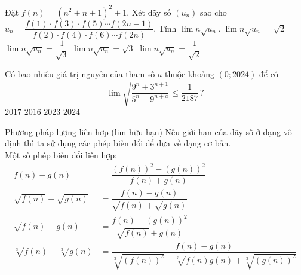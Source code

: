 \begin{ex}%
	Đặt $f(n)=\left(n^2+n+1\right)^2+1$.
	Xét dãy số $(u_n)$ sao cho $u_n=\dfrac{f(1)\cdot f(3)\cdot f(5)\cdots f(2n-1)}{f(2)\cdot f(4)\cdot f(6)\cdots f(2n)}$. Tính $\lim n\sqrt{u_n}$. 
	\choice
	{$\lim n\sqrt{u_n}=\sqrt{2}$}
	{$\lim n\sqrt{u_n}=\dfrac{1}{\sqrt{3}}$}
	{$\lim n\sqrt{u_n}=\sqrt{3}$}
	{\True $\lim n\sqrt{u_n}=\dfrac{1}{\sqrt{2}}$}
\end{ex}
\begin{ex}%
	Có bao nhiêu giá trị nguyên của tham số $a$ thuộc khoảng $(0;2024)$ để có
	\[ \lim\sqrt{\dfrac{9^n+3^{n+1}}{5^n+9^{n+a}}}\leq\dfrac{1}{2187}\,? \]
	\choice
	{\True $2017$}
	{$2016$}
	{$2023$}
	{$2024$}
\end{ex}
\begin{dang}{Phương pháp lượng liên hợp (lim hữu hạn)}
	Nếu giới hạn của dãy số ở dạng vô định thì ta sử dụng các phép biến đổi để đưa về dạng cơ bản. \\
	Một số phép biến đổi liên hợp: \\
	\begin{align*}
		f(n) - g(n) &= \dfrac{(f(n))^2 - (g(n))^2}{f(n) + g(n)} \\
		\sqrt{f(n)} - \sqrt{g(n)} &= \dfrac{f(n) - g(n)}{\sqrt{f(n)} + \sqrt{g(n)}} \\
		\sqrt{f(n)} - g(n) &= \dfrac{f(n) - (g(n))^2}{\sqrt{f(n)} + g(n)} \\
		\sqrt[3]{f(n)} - \sqrt[3]{g(n)} &= \dfrac{f(n) - g(n)}{\sqrt[3]{(f(n))^2} + \sqrt[3]{f(n)g(n)} + \sqrt[3]{(g(n))^2}}
	\end{align*}
	
\end{dang}
